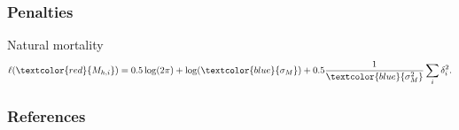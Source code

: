 \documentclass{beamer}
\begin{document}

\begin{frame}
\frametitle{Penalties}
Natural mortality
\begin{equation*}
  \ell(\textcolor{red}{M_{h,i}}) = 
  0.5 \log (2 \pi) + \log (\textcolor{blue}{\sigma_{M}}) + 0.5
  \frac{1}{\textcolor{blue}{\sigma^2_{M}}} \sum_i
  \delta_i^2.
\end{equation*}
\end{frame}


\begin{frame}
\frametitle{References}


\end{frame}

\end{document}
